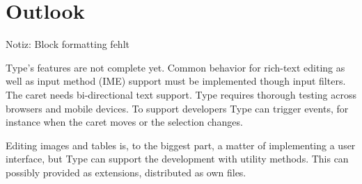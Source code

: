  
 



\section{Outlook}

Notiz: Block formatting fehlt

Type's features are not complete yet. Common behavior for rich-text editing as well as input method (IME) support must be implemented though input filters. The caret needs bi-directional text support. Type requires thorough testing across browsers and mobile devices. To support developers Type can trigger events, for instance when the caret moves or the selection changes.

Editing images and tables is, to the biggest part, a matter of implementing a user interface, but Type can support the development with utility methods. This can possibly provided as extensions, distributed as own files.








